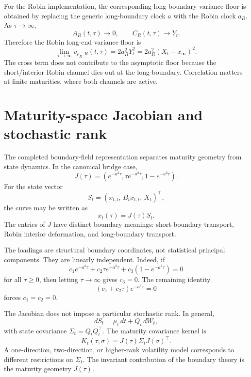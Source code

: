 \documentclass[11pt]{article}
\numberwithin{equation}{section}
\begin{document}
For the Robin implementation, the corresponding long-boundary variance floor is obtained by replacing the generic long-boundary clock \(a\) with the Robin clock \(a_R\). As \(\tau\to\infty\),
\[
A_R(t,\tau)\to0,
\qquad
C_R(t,\tau)\to Y_t.
\]
Therefore the Robin long-end variance floor is
\begin{equation}
\label{eq:long-end-variance-floor}
\lim_{\tau\to\infty}v_{\rho_R,R}(t,\tau)
=
2a_R^2Y_t^2
=
2a_R^2(X_t-x_\infty)^2.
\end{equation}
The cross term does not contribute to the asymptotic floor because the short/interior Robin channel dies out at the long-boundary. Correlation matters at finite maturities, where both channels are active.

\section{Maturity-space Jacobian and stochastic rank}

The completed boundary-field representation separates maturity geometry from state dynamics. In the canonical bridge case,
\begin{equation}
\label{eq:boundary-jacobian}
J(\tau)
=
\left(
 e^{-a^2\tau},
 \tau e^{-a^2\tau},
 1-e^{-a^2\tau}
\right).
\end{equation}
For the state vector
\[
S_t=\left(x_{t,t},\,B_tx_{t,t},\,X_t\right)^\top,
\]
the curve may be written as
\begin{equation}
\label{eq:jacobian-state-representation}
x_t(\tau)=J(\tau)S_t.
\end{equation}
The entries of \(J\) have distinct boundary meanings: short-boundary transport, Robin interior deformation, and long-boundary transport.

The loadings are structural boundary coordinates, not statistical principal components. They are linearly independent. Indeed, if
\[
c_1e^{-a^2\tau}+c_2\tau e^{-a^2\tau}+c_3(1-e^{-a^2\tau})=0
\]
for all \(\tau\ge0\), then letting \(\tau\to\infty\) gives \(c_3=0\). The remaining identity
\[
(c_1+c_2\tau)e^{-a^2\tau}=0
\]
forces \(c_1=c_2=0\).

The Jacobian does not impose a particular stochastic rank. In general,
\[
dS_t=\mu_t\,dt+Q_t\,dW_t,
\]
with state covariance \(\Sigma_t=Q_tQ_t^\top\). The maturity covariance kernel is
\begin{equation}
\label{eq:jacobian-covariance-kernel}
K_t(\tau,\sigma)=J(\tau)\Sigma_tJ(\sigma)^\top.
\end{equation}
A one-direction, two-direction, or higher-rank volatility model corresponds to different restrictions on \(\Sigma_t\). The invariant contribution of the boundary theory is the maturity geometry \(J(\tau)\).
\end{document}
